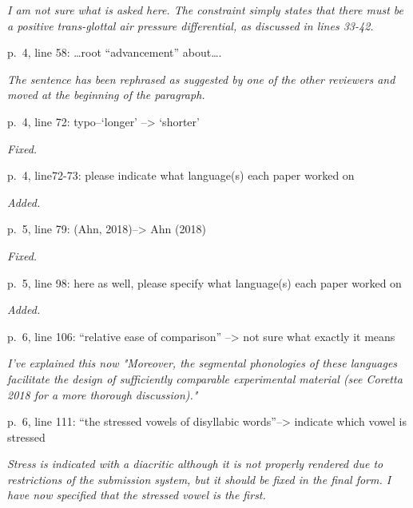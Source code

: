 \documentclass[]{article}
\begin{document}
\begin{adjustwidth}{1cm}{} \textit{
I am not sure what is asked here. The constraint simply states that there must be a positive trans-glottal air pressure differential, as discussed in lines 33-42.
} \end{adjustwidth}

p.~4, line 58: \ldots{}root ``advancement'' about\ldots{}.

\begin{adjustwidth}{1cm}{} \textit{
The sentence has been rephrased as suggested by one of the other reviewers and moved at the beginning of the paragraph.
} \end{adjustwidth}

p.~4, line 72: typo--`longer' --\textgreater{} `shorter'

\begin{adjustwidth}{1cm}{} \textit{
Fixed.
} \end{adjustwidth}

p.~4, line72-73: please indicate what language(s) each paper worked on

\begin{adjustwidth}{1cm}{} \textit{
Added.
} \end{adjustwidth}

p.~5, line 79: (Ahn, 2018)--\textgreater{} Ahn (2018)

\begin{adjustwidth}{1cm}{} \textit{
Fixed.
} \end{adjustwidth}

p.~5, line 98: here as well, please specify what language(s) each paper
worked on

\begin{adjustwidth}{1cm}{} \textit{
Added.
} \end{adjustwidth}

p.~6, line 106: ``relative ease of comparison'' --\textgreater{} not
sure what exactly it means

\begin{adjustwidth}{1cm}{} \textit{
I've explained this now "Moreover, the segmental phonologies of these languages facilitate the design of sufficiently comparable experimental material (see Coretta 2018 for a more thorough discussion)."
} \end{adjustwidth}

p.~6, line 111: ``the stressed vowels of disyllabic
words''--\textgreater{} indicate which vowel is stressed

\begin{adjustwidth}{1cm}{} \textit{
Stress is indicated with a diacritic although it is not properly rendered due to restrictions of the submission system, but it should be fixed in the final form. I have now specified that the stressed vowel is the first.
} \end{adjustwidth}
\end{document}
